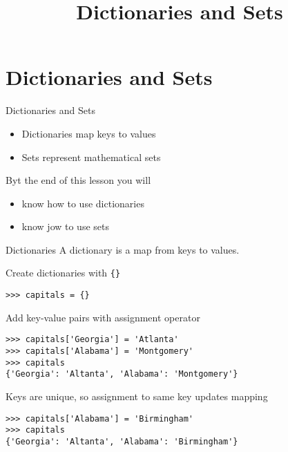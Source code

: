 \documentclass[smaller, aspectratio=1610]{beamer}
\date{}
\title{Dictionaries and Sets}
\begin{document}
\maketitle

\section{Dictionaries and Sets}
\label{sec:orgf9963c1}

\begin{frame}[label={sec:org2d343ba}]{Dictionaries and Sets}
\begin{itemize}
\item Dictionaries map keys to values
\item Sets represent mathematical sets
\end{itemize}

Byt the end of this lesson you will

\begin{itemize}
\item know how to use dictionaries
\item know jow to use sets
\end{itemize}
\end{frame}

\begin{frame}[label={sec:org47b10e7},fragile]{Dictionaries}
 A dictionary is a map from keys to values.

Create dictionaries with \texttt{\{\}}

\lstset{language=Python,label= ,caption= ,captionpos=b,numbers=none}
\begin{lstlisting}
>>> capitals = {}
\end{lstlisting}

Add key-value pairs with assignment operator

\lstset{language=Python,label= ,caption= ,captionpos=b,numbers=none}
\begin{lstlisting}
>>> capitals['Georgia'] = 'Atlanta'
>>> capitals['Alabama'] = 'Montgomery'
>>> capitals
{'Georgia': 'Altanta', 'Alabama': 'Montgomery'}
\end{lstlisting}

Keys are unique, so assignment to same key updates mapping

\lstset{language=Python,label= ,caption= ,captionpos=b,numbers=none}
\begin{lstlisting}
>>> capitals['Alabama'] = 'Birmingham'
>>> capitals
{'Georgia': 'Altanta', 'Alabama': 'Birmingham'}
\end{lstlisting}
\end{frame}
\end{document}
